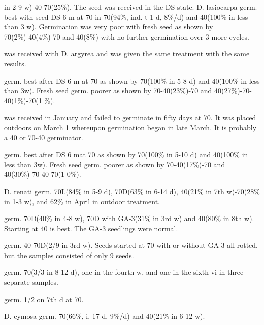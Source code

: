 \begin{description}
in 2-9 w)-40-70(25\%). The seed was received in the DS state.
D. lasiocarpa germ. best with seed DS 6 m at 70 in 70(94\%, ind. t 1 d, 8\%/d)
and 40(100\% in less than 3 w). Germination was very poor with fresh seed as shown
by 70(2\%)-40(4\%)-70 and 40(8\%) with no further germination over 3 more cycles.
\item[D. lemmonii] was received with D. argyrea and was given the same treatment
with the same results.
\item[D. parnassica] germ. best after DS 6 m at 70 as shown by 70(100\% in 5-8 d) and
40(100\% in less than 3w). Fresh seed germ. poorer as shown by 70-40(23\%)-70 and
40(27\%)-70-40(1\%)-70(1 \%).

\item[D. polytricha] was received in January and failed to germinate in fifty days at 70.
It was placed outdoors on March 1 whereupon germination began in late March. It is
probably a 40 or 70-40 germinator.
\item[D. sartori] germ. best after DS 6 mat 70 as shown by 70(100\% in 5-10 d) and
40(100\% in less than 3w). Fresh seed germ. poorer as shown by 70-40(17\%)-70 and
40(30\%)-70-40-70(1 0\%).

\item[Dracocephalum (Lamiaceae)] D. renati germ. 70L(84\% in 5-9 d),
70D(63\% in 6-14 d), 40(21\% in 7th w)-70(28\% in 1-3 w), and 62\% in April in outdoor
treatment.
\item[Dryandra (Proteaceae)]
\item[D. formosa] germ. 70D(40\% in 4-8 w), 70D with GA-3(31\% in 3rd w) and
40(80\% in 8th w). Starting at 40 is best. The GA-3 seedlings were normal.
\item[D. serra] germ. 40-70D(2/9 in 3rd w). Seeds started at 70 with or without GA-3
all rotted, but the samples consisted of only 9 seeds.

\item[Dryas (Rosaceae)]
\item[D. octapetala] germ. 70(3/3 in 8-12 d), one in the fourth w, and one in the sixth vi
in three separate samples.
\item[D. sundermannii] germ. 1/2 on 7th d at 70.

\item[Dudleya (Crassulaceae)] D. cymosa germ. 70(66\%, i. 17 d, 9\%/d) and
40(21\% in 6-12 w).

\end{description}
